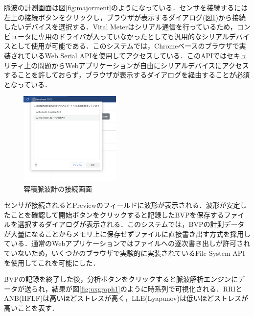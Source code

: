 脈波の計測画面は図\ref{fig:majorment}のようになっている．センサを接続するには左上の接続ボタンをクリックし，ブラウザが表示するダイアログ(図\ref{fig:connectconfirm})から接続したいデバイスを選択する．Vital Meterはシリアル通信を行っているため，コンピュータに専用のドライバが入っていなかったとしても汎用的なシリアルデバイスとして使用が可能である．このシステムでは，Chromeベースのブラウザで実装されているWeb Serial API\cite{webserialapi}を使用してアクセスしている．このAPIではセキュリティ上の問題からWebアプリケーションが自由にシリアルデバイスにアクセスすることを許しておらず，ブラウザが表示するダイアログを経由することが必須となっている．

\begin{figure}[htbp]
  \begin{minipage}{\hsize}
    \begin{center}
       \includegraphics[width=50mm]{img/connectconfirm.png}
    \end{center}
    \caption{容積脈波計の接続画面}
    \label{fig:connectconfirm}
  \end{minipage}
\end{figure}

センサが接続されるとPreviewのフィールドに波形が表示される．波形が安定したことを確認して開始ボタンをクリックすると記録したBVPを保存するファイルを選択するダイアログが表示される．このシステムでは，BVPの計測データが大量になることからメモリ上に保存せずファイルに直接書き出す方式を採用している．通常のWebアプリケーションではファイルへの逐次書き出しが許可されていないため，いくつかのブラウザで実験的に実装されているFile System API\cite{filesystemapi}を使用してこれを可能にした．

BVPの記録を終了した後，分析ボタンをクリックすると脈波解析エンジンにデータが送られ，結果が図\ref{fig:uxgraph1}のように時系列で可視化される．RRIとANB(HFLF)は高いほどストレスが高く，LLE(Lyapunov)は低いほどストレスが高いことを表す．

